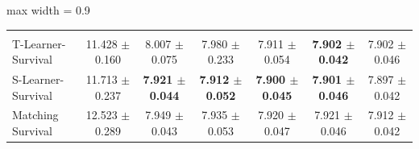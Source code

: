\begin{table}[htbp]
{\begin{adjustbox}{max width = 0.9\textwidth}
\begin{tabular}{lcccccc}
        \addlinespace %
        \multicolumn{7}{l}{\textit{Survival Meta-Learners}} \\
        T-Learner-Survival & 11.428 $\pm$ 0.160 & 8.007 $\pm$ 0.075 & 7.980 $\pm$ 0.233 & 7.911 $\pm$ 0.054 & \textbf{7.902 $\pm$ 0.042} & 7.902 $\pm$ 0.046 \\ 
        S-Learner-Survival & 11.713 $\pm$ 0.237 & \textbf{7.921 $\pm$ 0.044} & \textbf{7.912 $\pm$ 0.052} & \textbf{7.900 $\pm$ 0.045} & \textbf{7.901 $\pm$ 0.046} & 7.897 $\pm$ 0.042 \\ 
        Matching Survival & 12.523 $\pm$ 0.289 & 7.949 $\pm$ 0.043 & 7.935 $\pm$ 0.053 & 7.920 $\pm$ 0.047 & 7.921 $\pm$ 0.046 & 7.912 $\pm$ 0.042 \\
    \bottomrule
    \end{tabular}
    \end{adjustbox}
    \par
}
\end{table}